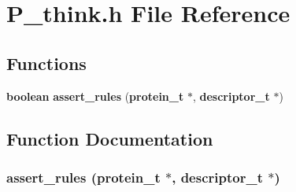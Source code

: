 \section{P\_\-think.h File Reference}
\label{P__think_8h}
\subsection*{Functions}
\begin{CompactItemize}
\item 
{\bf boolean} {\bf assert\_\-rules} ({\bf protein\_\-t} $\ast$, {\bf descriptor\_\-t} $\ast$)
\end{CompactItemize}


\subsection{Function Documentation}
\subsubsection{ assert\_\-rules ({\bf protein\_\-t} $\ast$, {\bf descriptor\_\-t} $\ast$)}\label{P__think_8h_a0}



